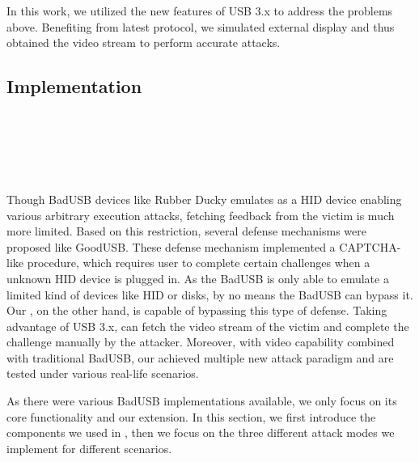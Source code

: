 In this work, we utilized the new features of USB 3.x \cite{usb31} \cite{usb32} to address the problems above.
Benefiting from latest protocol, we simulated external display and thus obtained the video stream to perform accurate attacks.

\subsection{Implementation}
\noindent{}\\
\\
\\
\\
\\
Though BadUSB devices\cite{badusb} like Rubber Ducky\cite{rubber, rubberducky2020} emulates as a HID device enabling various arbitrary execution attacks, fetching feedback from the victim is much more limited. Based on this restriction, several defense mechanisms were proposed  like GoodUSB\cite{tian2015defending}. These defense mechanism implemented a CAPTCHA-like\cite{captcha} procedure, which requires user to complete certain challenges when a unknown HID device is plugged in. As the BadUSB is only able to emulate a limited kind of devices like HID or disks, by no means the BadUSB can bypass it. Our \tool, on the other hand, is capable of bypassing this type of defense. Taking advantage of USB 3.x\cite{usb31}\cite{usb32}, \tool can fetch the video stream of the victim and complete the challenge manually by the attacker. Moreover, with video capability combined with traditional BadUSB, our \tool achieved multiple new attack paradigm and are tested under various real-life scenarios.

As there were various BadUSB implementations available, we only focus on its core functionality and our extension. In this section, we first introduce the components we used in \tool, then we focus on the three different attack modes we implement  for different scenarios.


